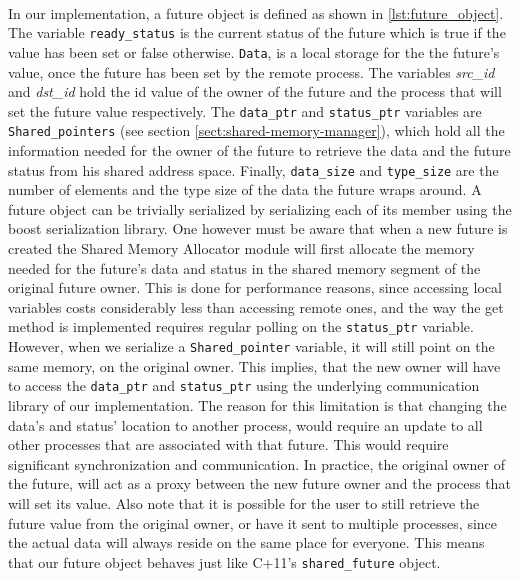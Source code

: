 \paragraph{}
In our implementation, a future object is defined as shown in \ref{lst:future_object}.
The variable \texttt{ready\_status} is the current
status of the future which is true if the value has been set or false otherwise.  \texttt{Data}, is a local storage for the
the future's value, once the future has been set by the remote process.  The variables \emph{src\_id} and \emph{dst\_id}
hold the id value of the owner of the future and the process that will set the future value respectively.  
The \texttt{data\_ptr} and \texttt{status\_ptr} variables are \texttt{Shared\_pointers} 
(see section \ref{sect:shared-memory-manager}),
which hold all the
information needed for the owner of the future to retrieve the data and the future status from his shared address space. 
Finally, \texttt{data\_size} and \texttt{type\_size} are the number of elements and the
type size of the data the future wraps around.  A future object can be trivially serialized by serializing each
of its member using the boost serialization library.  One however must be aware that when a new future is created
the Shared Memory Allocator module will first allocate the memory needed for the future's data and status in the 
shared memory segment of the original future owner.  This is done for performance reasons, since accessing local
variables costs considerably less than accessing remote ones, and the way the get method is implemented requires 
regular polling on the \texttt{status\_ptr} variable.  However, when we serialize a \texttt{Shared\_pointer} variable,
it will still point on the same memory, on the original owner.  This implies, that the new owner will have to 
access the \texttt{data\_ptr} and \texttt{status\_ptr} using the underlying communication library of our implementation.
The reason for this limitation is that changing the data's and status' location to another process, would require an 
update to all other processes that are associated with that future.  This would require significant synchronization and
communication. In practice, the original owner of the
future, will act as a proxy between the new future owner and the process that will set its value.  Also note that it is
possible for the user to still retrieve the future value from the original owner, or have it sent to multiple
processes, since the actual data will always reside on the same place for everyone.  This means that our future 
object behaves just like C+11's \texttt{shared\_future} object. 

